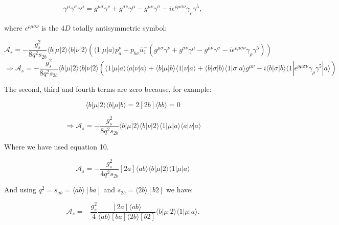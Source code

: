 			\begin{equation}
			\gamma^\mu\gamma^\sigma\gamma^\mu=g^{\mu\sigma}\gamma^\nu + g^{\sigma\nu}\gamma^\mu - g^{\mu\nu}\gamma^\sigma - i\epsilon^{\rho\mu\sigma\nu}\gamma_\rho\gamma^5,
			\end{equation}

			where $\epsilon^{\rho\mu\sigma\nu}$ is the $4D$ totally antisymmetric symbol:

			\begin{equation}
			\mathcal{A}_s=-\frac{g^2_s}{8q^2s_{2b}}\langle{b}|\mu|2\rangle\langle{b}|\nu|2\rangle
			\left(\langle 1|\mu|a\rangle p_a^\nu + p_{b\sigma}\overline{u}^-_1(g^{\mu\sigma}\gamma^\nu + g^{\sigma\nu}\gamma^\mu - g^{\mu\nu}\gamma^\sigma - i\epsilon^{\rho\mu\sigma\nu}\gamma_\rho\gamma^5)\right)
			\end{equation}
			\begin{equation}
			\Rightarrow\mathcal{A}_s=-\frac{g^2_s}{8q^2s_{2b}}\langle{b}|\mu|2\rangle\langle{b}|\nu|2\rangle
			\left(\langle 1|\mu|a\rangle \langle a|\nu|a\rangle\!+\!\langle b|\mu|b\rangle\langle 1|\nu|a\rangle\!+\!\langle b|\sigma|b\rangle\langle1|\sigma|a\rangle
			g^{\mu\nu}\!-\!i\langle b|\sigma|b\rangle\langle 1|\epsilon^{\rho\mu\sigma\nu}\gamma_\rho\gamma^5|a\rangle\right)
			\end{equation}

			The second, third and fourth terms are zero because, for example:

			\begin{equation}
			\langle b|\mu|2\rangle\langle b|\mu|b\rangle = 2[2b]\langle b b\rangle = 0
			\end{equation}

			\begin{equation}
			\Rightarrow\mathcal{A}_s=-\frac{g^2_s}{8q^2s_{2b}}\langle{b}|\mu|2\rangle\langle{b}|\nu|2\rangle\langle{1}|\mu|a\rangle\langle{a}|\nu|a\rangle
			\end{equation}

			Where we have used equation 10.

			\begin{equation}
			\mathcal{A}_s=-\frac{g^2_s}{4q^2s_{2b}}[2a]\langle ab\rangle\langle{b}|\mu|2\rangle\langle{1}|\mu|a\rangle
			\end{equation}

			And using $q^2=s_{ab}=\langle ab\rangle[ba]$ and $s_{2b}=\langle2b\rangle[b2]$ we have:

			\begin{equation}
			\mathcal{A}_s=-\frac{g^2_s}{4}\frac{[2a]\langle ab\rangle}{\langle ab\rangle[ba]\langle2b\rangle[b2]}\langle{b}|\mu|2\rangle\langle{1}|\mu|a\rangle.
			\end{equation}

